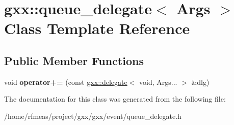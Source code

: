 \hypertarget{classgxx_1_1queue__delegate}{}\section{gxx\+:\+:queue\+\_\+delegate$<$ Args $>$ Class Template Reference}
\label{classgxx_1_1queue__delegate}
\subsection*{Public Member Functions}
\begin{DoxyCompactItemize}
\item 
void {\bfseries operator+=} (const \hyperlink{classgxx_1_1delegate}{gxx\+::delegate}$<$ void, Args... $>$ \&dlg)\hypertarget{classgxx_1_1queue__delegate_a1f65d8e5b29e2a9174f365b1ebedc204}{}\label{classgxx_1_1queue__delegate_a1f65d8e5b29e2a9174f365b1ebedc204}

\end{DoxyCompactItemize}


The documentation for this class was generated from the following file\+:\begin{DoxyCompactItemize}
\item 
/home/rfmeas/project/gxx/gxx/event/queue\+\_\+delegate.\+h\end{DoxyCompactItemize}
